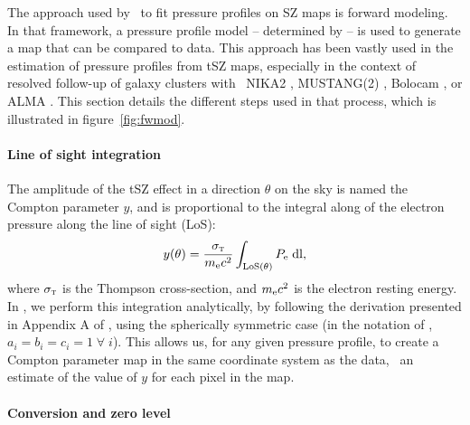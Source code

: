 The approach used by \panco\ to fit pressure profiles on SZ maps is forward modeling.
In that framework, a pressure profile model -- determined by  -- is used to generate a map that can be compared to data.
This approach has been vastly used in the estimation of pressure profiles from tSZ maps, especially in the context of resolved follow-up of galaxy clusters with \eg\ NIKA2 \citep[\eg][]{munoz-echeverria_multi-probe_2022,keruzore_exploiting_2020}, MUSTANG(2) \citep[\eg][]{romero_galaxy_2017,romero_pressure_2020}, Bolocam \citep[\eg][]{sayers_evolution_2022}, or ALMA \citep[\eg][]{di_mascolo_joint_2019}.
This section details the different steps used in that process, which is illustrated in figure~\ref{fig:fwmod}.

\paragraph{Line of sight integration}

The amplitude of the tSZ effect in a direction $\theta$ on the sky is named the Compton parameter $y$, and is proportional to the integral along of the electron pressure along the line of sight (LoS):
\begin{equation}
    \label{eq:algo_ysz}
    y(\theta) = \frac{\sigma_\textsc{t}}{m_{\rm e}c^2} \int_{\rm LoS(\theta)} P_{\rm e} \; \dd l,
\end{equation}
where $\sigma_\textsc{t}$ is the Thompson cross-section, and $m_{\rm e} c^2$ is the electron resting energy. \\
In \panco, we perform this integration analytically, by following the derivation presented in Appendix A of \citet{romero_multi-instrument_2018}, using the spherically symmetric case (in the notation of \citeauthor{romero_multi-instrument_2018}, $a_i = b_i = c_i = 1 \; \forall \; i$).
This allows us, for any given pressure profile, to create a Compton parameter map in the same coordinate system as the data, \ie\ an estimate of the value of $y$ for each pixel in the map.

\paragraph{Conversion and zero level}

